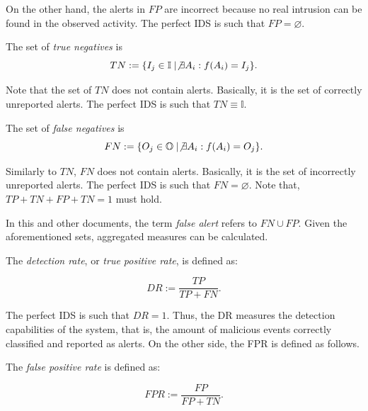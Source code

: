 \noindent On the other hand, the alerts in $FP$ are incorrect because
no real intrusion can be found in the observed activity. The perfect
\ac{IDS} is such that $FP = \varnothing$.

\begin{definition}
  The set of \emph{true negatives} is
  \begin{displaymath}
    TN := \{I_{j} \in \mathbb{I} \mid \not\exists A_{i}: f(A_{i}) =
    I_{j}\}.
  \end{displaymath}
\end{definition}

\noindent Note that the set of $TN$ does not contain
alerts. Basically, it is the set of correctly unreported alerts. The
perfect \ac{IDS} is such that $TN \equiv \mathbb{I}$.

\begin{definition}
  The set of \emph{false negatives} is
  \begin{displaymath}
    FN := \{O_{j} \in \mathbb{O} \mid \not\exists A_{i}: f(A_{i}) =
    O_{j}\}.
  \end{displaymath}
\end{definition}

\noindent Similarly to $TN$, $FN$ does not contain alerts. Basically,
it is the set of incorrectly unreported alerts. The perfect \ac{IDS}
is such that $FN = \varnothing$. Note that, $TP + TN + FP + TN = 1$
must hold.

In this and other documents, the term \emph{false alert} refers to $FN
\cup FP$. Given the aforementioned sets, aggregated measures can be
calculated.

\begin{definition}[\ac{DR}]
  The \emph{detection rate}, or \emph{true positive rate}, is defined
  as:

  \begin{displaymath}
    DR := \frac{TP}{TP + FN}.
  \end{displaymath}
\end{definition}

\noindent The perfect \ac{IDS} is such that $DR = 1$. Thus, the
\ac{DR} measures the detection capabilities of the system, that is,
the amount of malicious events correctly classified and reported as
alerts. On the other side, the \ac{FPR} is defined as follows.

\begin{definition}[\ac{FPR}]
  The \emph{false positive rate} is defined as:

  \begin{displaymath}
    FPR := \frac{FP}{FP + TN}.
  \end{displaymath}
\end{definition}

